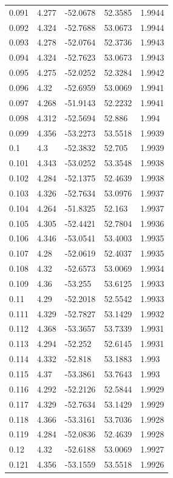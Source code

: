 \begin{tabular}{lllll}
0.091 & 4.277 & -52.0678 & 52.3585 & 1.9944 \\
0.092 & 4.324 & -52.7688 & 53.0673 & 1.9944 \\
0.093 & 4.278 & -52.0764 & 52.3736 & 1.9943 \\
0.094 & 4.324 & -52.7623 & 53.0673 & 1.9943 \\
0.095 & 4.275 & -52.0252 & 52.3284 & 1.9942 \\
0.096 & 4.32 & -52.6959 & 53.0069 & 1.9941 \\
0.097 & 4.268 & -51.9143 & 52.2232 & 1.9941 \\
0.098 & 4.312 & -52.5694 & 52.886 & 1.994 \\
0.099 & 4.356 & -53.2273 & 53.5518 & 1.9939 \\
0.1 & 4.3 & -52.3832 & 52.705 & 1.9939 \\
0.101 & 4.343 & -53.0252 & 53.3548 & 1.9938 \\
0.102 & 4.284 & -52.1375 & 52.4639 & 1.9938 \\
0.103 & 4.326 & -52.7634 & 53.0976 & 1.9937 \\
0.104 & 4.264 & -51.8325 & 52.163 & 1.9937 \\
0.105 & 4.305 & -52.4421 & 52.7804 & 1.9936 \\
0.106 & 4.346 & -53.0541 & 53.4003 & 1.9935 \\
0.107 & 4.28 & -52.0619 & 52.4037 & 1.9935 \\
0.108 & 4.32 & -52.6573 & 53.0069 & 1.9934 \\
0.109 & 4.36 & -53.255 & 53.6125 & 1.9933 \\
0.11 & 4.29 & -52.2018 & 52.5542 & 1.9933 \\
0.111 & 4.329 & -52.7827 & 53.1429 & 1.9932 \\
0.112 & 4.368 & -53.3657 & 53.7339 & 1.9931 \\
0.113 & 4.294 & -52.252 & 52.6145 & 1.9931 \\
0.114 & 4.332 & -52.818 & 53.1883 & 1.993 \\
0.115 & 4.37 & -53.3861 & 53.7643 & 1.993 \\
0.116 & 4.292 & -52.2126 & 52.5844 & 1.9929 \\
0.117 & 4.329 & -52.7634 & 53.1429 & 1.9929 \\
0.118 & 4.366 & -53.3161 & 53.7036 & 1.9928 \\
0.119 & 4.284 & -52.0836 & 52.4639 & 1.9928 \\
0.12 & 4.32 & -52.6188 & 53.0069 & 1.9927 \\
0.121 & 4.356 & -53.1559 & 53.5518 & 1.9926 \\

\end{tabular}
